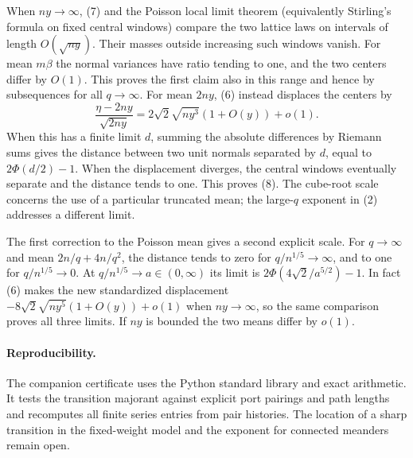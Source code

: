 \documentclass[11pt,letterpaper]{article}
\begin{document}
When \(ny\to\infty\), (7) and the Poisson local limit theorem
(equivalently Stirling's formula on fixed central windows) compare
the two lattice laws on intervals of length \(O(\sqrt{ny})\).
Their masses outside increasing such windows vanish.
For mean \(m\beta\) the normal variances have ratio tending to one,
and the two centers differ by \(O(1)\). This proves the first claim
also in this range and hence by subsequences for all \(q\to\infty\).
For mean \(2ny\), (6) instead displaces the centers by
\[
 \frac{\eta-2ny}{\sqrt{2ny}}
 = 2\sqrt{2}\sqrt{ny^3}(1+O(y))+o(1).
\]
When this has a finite limit \(d\), summing the absolute differences
by Riemann sums gives the distance between two unit normals separated
by \(d\), equal to \(2\Phi(d/2)-1\). When the displacement diverges,
the central windows eventually separate and the distance tends to one.
This proves (8). The cube-root scale concerns the use of a particular
truncated mean; the large-\(q\) exponent in (2) addresses a different
limit.

The first correction to the Poisson mean gives a second explicit
scale. For \(q\to\infty\) and mean \(2n/q+4n/q^2\), the
distance tends to zero for \(q/n^{1/5}\to\infty\), and to one for
\(q/n^{1/5}\to0\). At \(q/n^{1/5}\to a\in(0,\infty)\)
its limit is \(2\Phi(4\sqrt2/a^{5/2})-1\). In fact (6) makes the
new standardized displacement \(-8\sqrt2\sqrt{ny^5}(1+O(y))+o(1)\)
when \(ny\to\infty\), so the same comparison proves all three limits.
If \(ny\) is bounded the two means differ by \(o(1)\).

\paragraph{Reproducibility.}
The companion certificate uses the Python standard library and exact arithmetic. It tests the transition
majorant against explicit port pairings and path lengths and
recomputes all finite series entries from pair histories.
The location of a sharp transition in the fixed-weight model and
the exponent for connected meanders remain open.
\end{document}
